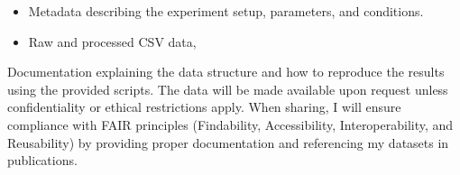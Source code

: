 \documentclass{article}
\begin{document}
\begin{itemize} \item Metadata describing the experiment setup, parameters, and
	      conditions. \item Raw and processed CSV data, \end{itemize}

Documentation explaining the data structure and how to reproduce the results
using the provided scripts. The data will be made available upon request unless
confidentiality or ethical restrictions apply. When sharing, I will ensure
compliance with FAIR principles (Findability, Accessibility, Interoperability,
and Reusability) by providing proper documentation and referencing my datasets
in publications. \newpage  
\end{document}
